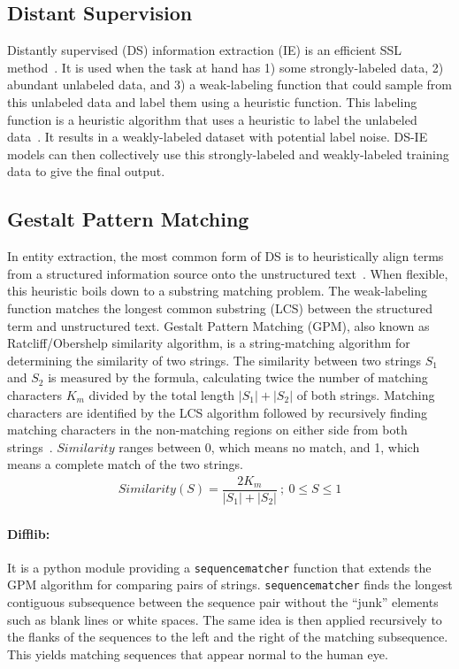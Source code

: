 \documentclass[11pt]{article}
\begin{document}
\subsection{Distant Supervision}
\label{subsec:ds}
%
Distantly supervised (DS) information extraction (IE) is an efficient SSL method~\cite{etzioni2008open,wen2019efficient}.
It is used when the task at hand has 1) some strongly-labeled data, 2) abundant unlabeled data, and 3) a weak-labeling function that could sample from this unlabeled data and label them using a heuristic function.
This labeling function is a heuristic algorithm that uses a heuristic to label the unlabeled data~\cite{pinto2003table, greaves2014relation}.
It results in a weakly-labeled dataset with potential label noise.
DS-IE models can then collectively use this strongly-labeled and weakly-labeled training data to give the final output.
%
\subsection{Gestalt Pattern Matching}
\label{subsec_gsp}
%
In entity extraction, the most common form of DS is to heuristically align terms from a structured information source onto the unstructured text~\cite{wen2019efficient}.
When flexible, this heuristic boils down to a substring matching problem. The weak-labeling function matches the longest common substring (LCS) between the structured term and unstructured text.
Gestalt Pattern Matching (GPM), also known as Ratcliff/Obershelp similarity algorithm, is a string-matching algorithm for determining the similarity of two strings.
The similarity between two strings $S_{1}$ and $S_{2}$ is measured by the formula, calculating twice the number of matching characters $K_{m}$ divided by the total length $|S_{1}| + |S_{2}|$ of both strings.
Matching characters are identified by the LCS algorithm followed by recursively finding matching characters in the non-matching regions on either side from both strings~\cite{ratcliff1988pattern}.
$Similarity$ ranges between 0, which means no match, and 1, which means a complete match of the two strings.
%
\begin{gather}
  Similarity (S) = \dfrac{ 2 K_{m}}{|S_{1}| + |S_{2}|} \: ; \: 0 \leq	 S \leq	 1
 \end{gather}
%
%
\paragraph{Difflib: }
\label{difflib}
It is a python module providing a {\tt sequencematcher} function that extends the GPM algorithm for comparing pairs of strings.
{\tt sequencematcher} finds the longest contiguous subsequence between the sequence pair without the ``junk'' elements such as blank lines or white spaces.
The same idea is then applied recursively to the flanks of the sequences to the left and the right of the matching subsequence.
This yields matching sequences that appear normal to the human eye.
%
\end{document}
